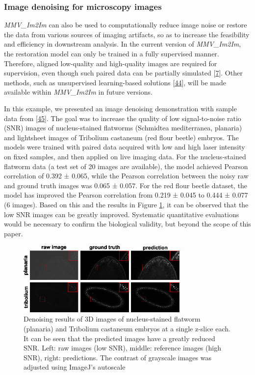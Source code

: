 \hypertarget{image-denoising-for-microscopy-images}{%
\subsubsection{Image denoising for microscopy images}\label{image-denoising-for-microscopy-images}}

\emph{MMV\_Im2Im} can also be used to computationally reduce image noise or restore the data from various sources of imaging artifacts, so as to increase the feasibility and efficiency in downstream analysis. In the current version of \emph{MMV\_Im2Im}, the restoration model can only be trained in a fully supervised manner. Therefore, aligned low-quality and high-quality images are required for supervision, even though such paired data can be partially simulated {[}\protect\hyperlink{ref-wcCVn8av}{7}{]}. Other methods, such as unsupervised learning-based solutions {[}\protect\hyperlink{ref-4vnyY9J9}{44}{]}, will be made available within \emph{MMV\_Im2Im} in future versions.

In this example, we presented an image denoising demonstration with sample data from {[}\protect\hyperlink{ref-12G712Zky}{45}{]}. The goal was to increase the quality of low signal-to-noise ratio (SNR) images of nucleus-stained flatworms (Schmidtea mediterranea, planaria) and lightsheet images of Tribolium castaneum (red flour beetle) embryos. The models were trained with paired data acquired with low and high laser intensity on fixed samples, and then applied on live imaging data. For the nucleus-stained flatworm data (a test set of 20 images are available), the model achieved Pearson correlation of 0.392 ± 0.065, while the Pearson correlation between the noisy raw and ground truth images was 0.065 ± 0.057. For the red flour beetle dataset, the model has improved the Pearson correlation from 0.219 ± 0.045 to 0.444 ± 0.077 (6 images). Based on this and the results in Figure \ref{fig:denoising}, it can be observed that the low SNR images can be greatly improved. Systematic quantitative evaluations would be necessary to confirm the biological validity, but beyond the scope of this paper.

\begin{figure}
\hypertarget{fig:denoising}{%
\centering
\includegraphics[width=0.75\textwidth,height=\textheight]{images/denoising_justin.png}
\caption{Denoising results of 3D images of nucleus-stained flatworm (planaria) and Tribolium castaneum embryos at a single z-slice each. It can be seen that the predicted images have a greatly reduced SNR. Left: raw images (low SNR), middle: reference images (high SNR), right: predictions. The contrast of grayscale images was adjusted using ImageJ's autoscale}\label{fig:denoising}
}
\end{figure}

